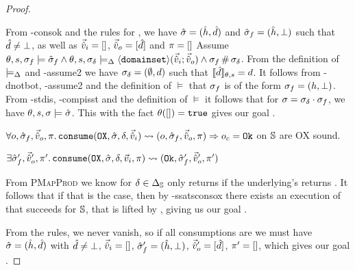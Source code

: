 \begin{proof}
\begin{hypvlist}
 From \hyp{consok} and the rules for \consume{}, we have $\hat{\sigma}=(\hat{h},\hat{d})$ and $\hat{\sigma}_f=(\hat{h},\bot)$ such that $\hat{d}\neq\bot$, as well as $\vec{\hat{v}}_i=[]$, $\vec{\hat{v}}_o=[\hat{d}]$ and $\pi=[]$
 Assume $\theta,s,\sigma_f\models \hat{\sigma}_f \land \theta, s, \sigma_\delta \models_{\Delta} \left<\texttt{domainset}\right>\!(\vec{\hat{v}}_i;\vec{\hat{v}}_o) \land \sigma_f\operatorname{\#}\sigma_\delta$.
 From the definition of $\models_{\Delta}$ and \hyp{assume2} we have $\sigma_\delta=(\emptyset, d)$ such that $\llbracket\hat{d}\rrbracket_{\theta,s}=d$.
 It follows from \hyp{dnotbot}, \hyp{assume2} and the definition of $\models$ that $\sigma_f$ is of the form $\sigma_f=(h, \bot)$.
 From \hyp{stdis}, \hyp{compisst} and the definition of $\models$ it follows that for $\sigma=\sigma_\delta\cdot\sigma_f$, we have $\theta,s,\sigma\models\hat{\sigma}$. This with the fact $\theta([])=\texttt{true}$ gives our goal .
\end{hypvlist}


\pfassume \begin{hypvlist}
 $\forall o, \hat{\sigma}_f,\vec{\hat{v}}_o,\pi \ldotp \texttt{consume}(\texttt{OX},\hat{\sigma},\delta,\vec{\hat{v}}_i)\rightsquigarrow (o, \hat{\sigma}_f, \vec{\hat{v}}_o, \pi)\Rightarrow o_c = \texttt{Ok}$
 \consume{} on $\mathbb S$ are OX sound.
\end{hypvlist}
\pfprove \begin{goalvlist}
 $\exists  \hat{\sigma}_f',\vec{\hat{v}}_o',\pi' \ldotp \texttt{consume}(\texttt{OX}, \hat{\sigma}, \delta,\vec{v}_i,\pi)\rightsquigarrow (\texttt{Ok}, \hat{\sigma}_f', \vec{\hat{v}}_o', \pi')$
\end{goalvlist}

\pfcase{$\delta \in \preds_\mmdl$}

From \textsc{PMapProd} we know \consume{} for $\delta\in\preds_\mmdl$ only returns \Ok{} if the underlying's \consume{} returns \Ok. It follows that if that is the case, then by \hyp{ssatsconsox} there exists an execution of \consume{} that succeeds for $\mathbb S$, that is lifted by \PMap, giving us our goal .

\pfcase{$\delta = \domainset$}

From the \consume{} rules, we never vanish, so if all consumptions are \Ok{} we must have $\hat{\sigma}=(\hat{h},\hat{d})$ with $\hat{d}\neq\bot$, $\vec{\hat{v}}_i=[]$, $\hat{\sigma}'_f=(\hat{h},\bot)$, $\vec{\hat{v}}_o'=[\hat{d}]$, $\pi'=[]$, which gives our goal .



\end{proof}
